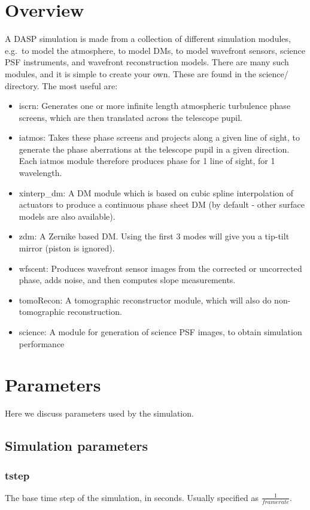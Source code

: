 \documentclass{article}
\begin{document}
\section{Overview}
A DASP simulation is made from a collection of different simulation
modules, e.g.\ to model the atmosphere, to model DMs, to model
wavefront sensors, science PSF instruments, and wavefront
reconstruction models.  There are many such modules, and it is simple
to create your own.  These are found in the science/ directory.  The most useful are:
\begin{itemize}
\item iscrn: Generates one or more infinite length atmospheric
  turbulence phase screens, which are then translated across the
  telescope pupil.
\item iatmos: Takes these phase screens and projects along a given
  line of sight, to generate the phase aberrations at the telescope
  pupil in a given direction.  Each iatmos module therefore produces
  phase for 1 line of sight, for 1 wavelength.
\item xinterp\_dm: A DM module which is based on cubic spline
  interpolation of actuators to produce a continuous phase sheet DM
  (by default - other surface models are also available).  
\item zdm: A Zernike based DM.  Using the first 3 modes will give you
  a tip-tilt mirror (piston is ignored).
\item wfscent: Produces wavefront sensor images from the corrected or
  uncorrected phase, adds noise, and then computes slope measurements.
\item tomoRecon: A tomographic reconstructor module, which will also
  do non-tomographic reconstruction.
\item science: A module for generation of science PSF images, to
  obtain simulation performance
\end{itemize}

\section{Parameters}
Here we discuss parameters used by the simulation.
\subsection{Simulation parameters}
\subsubsection{tstep}
The base time step of the simulation, in seconds.  Usually specified
as $\frac{1}{framerate}$.
\end{document}
